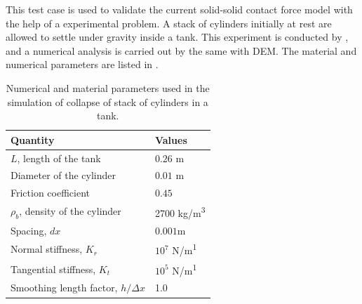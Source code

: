 This test case is used to validate the current solid-solid contact force model
with the help of a experimental problem. A stack of cylinders initially at rest
are allowed to settle under gravity inside a tank. This experiment is conducted
by \citep{zhang_simulation_2009}, and a numerical analysis is carried out by the
same with DEM. The material and numerical parameters are listed in
.
\begin{table}[!ht]
  \centering
  \begin{tabular}[!ht]{ll}
    \toprule
    Quantity & Values\\
    \midrule
    $L$, length of the tank & $0.26$ m \\
    Diameter of the cylinder & $0.01$ m \\
    Friction coefficient & $0.45$ \\
    $\rho_b$, density of the cylinder & 2700 kg/m\textsuperscript{3} \\
    Spacing, $dx$ & $0.001$m\\
    Normal stiffness, $K_r$ & $10^{7}$ N/m\textsuperscript{1}\\
    Tangential stiffness, $K_t$ & $10^{5}$ N/m\textsuperscript{1}\\
    Smoothing length factor, $h/\Delta x$ & 1.0\\
    \bottomrule
  \end{tabular}
  \caption{Numerical and material parameters used in the simulation of collapse
    of stack of cylinders in a tank.}%
  \label{tab:stack-of-cylinders}
\end{table}

